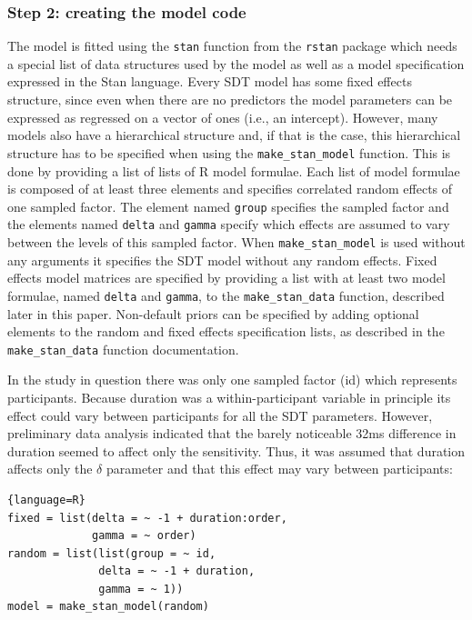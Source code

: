 \documentclass[oneside,a4paper]{article}
\begin{document}
\subsubsection{Step 2: creating the model code}

The model is fitted using the \texttt{stan} function from the
\texttt{rstan} package which needs a special list of data structures
used by the model as well as a model specification expressed in the
Stan language. Every SDT model has some fixed effects structure, since
even when there are no predictors the model parameters can be
expressed as regressed on a vector of ones (i.e., an
intercept). However, many models also have a hierarchical structure
and, if that is the case, this hierarchical structure has to be
specified when using the \texttt{make\_stan\_model} function. This is
done by providing a list of lists of R model formulae. Each list of
model formulae is composed of at least three elements and specifies
correlated random effects of one sampled factor. The element named
\texttt{group} specifies the sampled factor and the elements named
\texttt{delta} and \texttt{gamma} specify which effects are assumed to
vary between the levels of this sampled factor. When
\texttt{make\_stan\_model} is used without any arguments it specifies
the SDT model without any random effects. Fixed effects model matrices
are specified by providing a list with at least two model formulae,
named \texttt{delta} and \texttt{gamma}, to the
\texttt{make\_stan\_data} function, described later in this
paper. Non-default priors can be specified by adding optional elements
to the random and fixed effects specification lists, as described in
the \texttt{make\_stan\_data} function documentation.

In the study in question there was only one sampled factor (id) which
represents participants. Because duration was a within-participant
variable in principle its effect could vary between participants for
all the SDT parameters. However, preliminary data analysis indicated
that the barely noticeable 32ms difference in duration seemed to
affect only the sensitivity. Thus, it was assumed that duration
affects only the $\delta$ parameter and that this effect may vary
between participants:

\begin{lstlisting}{language=R}
fixed = list(delta = ~ -1 + duration:order, 
             gamma = ~ order)
random = list(list(group = ~ id, 
              delta = ~ -1 + duration, 
              gamma = ~ 1))
model = make_stan_model(random)
\end{lstlisting}
\end{document}
